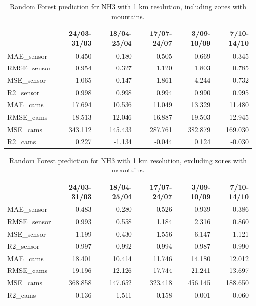 \begin{table}[H]
\begin{tabular}{lrrrrr}
\toprule
 &  24/03-31/03 &  18/04-25/04 &  17/07-24/07 &  3/09-10/09 &  7/10-14/10 \\
\midrule
 MAE\_sensor &        0.450 &        0.180 &        0.505 &       0.669 &       0.345 \\
RMSE\_sensor &        0.954 &        0.327 &        1.120 &       1.803 &       0.785 \\
 MSE\_sensor &        1.065 &        0.147 &        1.861 &       4.244 &       0.732 \\
  R2\_sensor &        0.998 &        0.998 &        0.994 &       0.990 &       0.995 \\
   MAE\_cams &       17.694 &       10.536 &       11.049 &      13.329 &      11.480 \\
  RMSE\_cams &       18.513 &       12.046 &       16.887 &      19.503 &      12.945 \\
   MSE\_cams &      343.112 &      145.433 &      287.761 &     382.879 &     169.030 \\
    R2\_cams &        0.227 &       -1.134 &       -0.044 &       0.124 &      -0.030 \\
\bottomrule
\end{tabular}
\caption{Random Forest prediction for NH3 with 1 km resolution, including zones with mountains.}
\end{table}
\begin{table}[H]
\begin{tabular}{lrrrrr}
\toprule
 &  24/03-31/03 &  18/04-25/04 &  17/07-24/07 &  3/09-10/09 &  7/10-14/10 \\
\midrule
 MAE\_sensor &        0.483 &        0.280 &        0.526 &       0.939 &       0.386 \\
RMSE\_sensor &        0.993 &        0.558 &        1.184 &       2.316 &       0.860 \\
 MSE\_sensor &        1.199 &        0.430 &        1.556 &       6.147 &       1.121 \\
  R2\_sensor &        0.997 &        0.992 &        0.994 &       0.987 &       0.990 \\
   MAE\_cams &       18.401 &       10.414 &       11.746 &      14.180 &      12.012 \\
  RMSE\_cams &       19.196 &       12.126 &       17.744 &      21.241 &      13.697 \\
   MSE\_cams &      368.858 &      147.652 &      323.418 &     456.145 &     188.650 \\
    R2\_cams &        0.136 &       -1.511 &       -0.158 &      -0.001 &      -0.060 \\
\bottomrule
\end{tabular}
\caption{Random Forest prediction for NH3 with 1 km resolution, excluding zones with mountains.}
\end{table}
